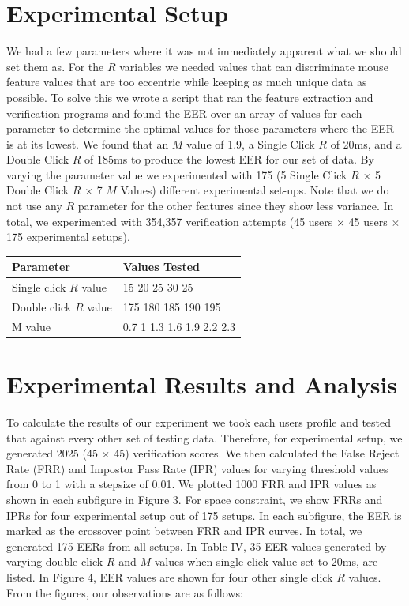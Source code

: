 \documentclass[conference]{IEEEtran}
\begin{document}
\section{Experimental Setup}
We had a few parameters where it was not immediately apparent what we should set them as. For the $R$ variables we needed values that can discriminate mouse feature values that are too eccentric while keeping as much unique data as possible. To solve this we wrote a script that ran the feature extraction and verification programs and found the EER over an array of values for each parameter to determine the optimal values for those parameters where the EER is at its lowest. We found that an $M$ value of 1.9, a Single Click $R$ of 20ms, and a Double Click $R$ of 185ms to produce the lowest EER for our set of data. By varying the parameter value we experimented with 175 (5 Single Click $R$ $\times$ 5 Double Click $R$ $\times$ 7 $M$ Values) different experimental set-ups. Note that we do not use any $R$ parameter for the other features since they show less variance. In total, we experimented with 354,357 verification attempts (45 users $\times$ 45 users $\times$ 175 experimental setups).

\begin{table}
\centering
{}
\def\arraystretch{1.5}
\begin{tabular}{ l| l}
\textbf{Parameter}              &\textbf{Values Tested} \\
\hline
Single click $R$ value		& 15 20 25 30 25  \\
Double click $R$ value	& 175 180 185 190 195\\
M value		& 0.7 1 1.3 1.6 1.9 2.2 2.3\\
\end{tabular}
\end{table}




\section{Experimental Results and Analysis}

To calculate the results of our experiment we took each users profile and tested that against every other set of testing data. Therefore, for experimental setup, we generated 2025 (45 $\times$ 45) verification scores. We then calculated the False Reject Rate (FRR) and Impostor Pass Rate (IPR) values for varying threshold values from 0 to 1 with a stepsize of 0.01. We plotted 1000 FRR and IPR values as shown in each subfigure in Figure 3. For space constraint, we show FRRs and IPRs for four experimental setup out of 175 setups. In each subfigure, the EER is marked as the crossover point between FRR and IPR curves. In total, we generated 175 EERs from all setups. In Table IV, 35 EER values generated by varying double click $R$ and $M$ values when single click value set to 20ms, are listed. In Figure 4, EER values are shown for four other single click $R$ values. From the figures, our observations are as follows:
\end{document}
